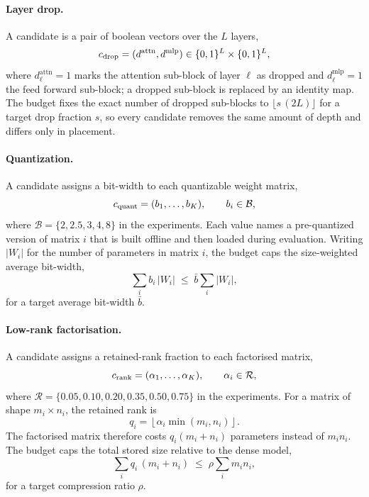 \paragraph{Layer drop.}
A candidate is a pair of boolean vectors over the $L$ layers,
\begin{equation}
c_{\mathrm{drop}}
=
(d^{\mathrm{attn}}, d^{\mathrm{mlp}})
\in \{0,1\}^{L} \times \{0,1\}^{L},
\end{equation}
where $d^{\mathrm{attn}}_\ell = 1$ marks the attention sub-block of layer $\ell$ as dropped and $d^{\mathrm{mlp}}_\ell = 1$ the feed forward sub-block; a dropped sub-block is replaced by an identity map. The budget fixes the exact number of dropped sub-blocks to $\lfloor s\,(2L) \rfloor$ for a target drop fraction $s$, so every candidate removes the same amount of depth and differs only in placement.

\paragraph{Quantization.}
A candidate assigns a bit-width to each quantizable weight matrix,
\begin{equation}
c_{\mathrm{quant}}
=
(b_1, \dots, b_K),
\qquad
b_i \in \mathcal{B},
\end{equation}
where $\mathcal{B}=\{2,2.5,3,4,8\}$ in the experiments. Each value names a pre-quantized version of matrix $i$ that is built offline and then loaded during evaluation. Writing $|W_i|$ for the number of parameters in matrix $i$, the budget caps the size-weighted average bit-width,
\begin{equation}
\sum_{i} b_i\,|W_i| \;\le\; \bar{b} \sum_{i} |W_i|,
\end{equation}
for a target average bit-width $\bar{b}$.

\paragraph{Low-rank factorisation.}
A candidate assigns a retained-rank fraction to each factorised matrix,
\begin{equation}
c_{\mathrm{rank}}
=
(\alpha_1, \dots, \alpha_K),
\qquad
\alpha_i \in \mathcal{R},
\end{equation}
where $\mathcal{R}=\{0.05,0.10,0.20,0.35,0.50,0.75\}$ in the experiments. For a matrix of shape $m_i \times n_i$, the retained rank is
\begin{equation}
q_i = \left\lfloor \alpha_i \min(m_i,n_i) \right\rfloor .
\end{equation}
The factorised matrix therefore costs $q_i(m_i+n_i)$ parameters instead of $m_i n_i$. The budget caps the total stored size relative to the dense model,
\begin{equation}
\sum_{i} q_i\,(m_i + n_i) \;\le\; \rho \sum_{i} m_i n_i,
\end{equation}
for a target compression ratio $\rho$.


